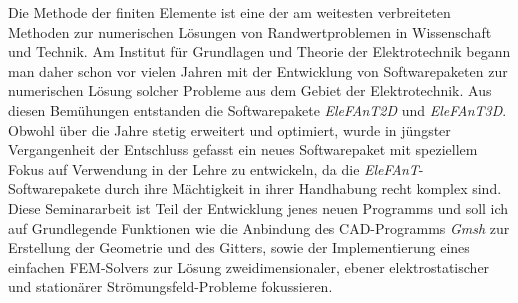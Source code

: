 Die Methode der finiten Elemente ist eine der am weitesten verbreiteten Methoden zur numerischen Lösungen von Randwertproblemen in Wissenschaft und Technik. Am Institut für Grundlagen und Theorie der Elektrotechnik begann man daher schon vor vielen Jahren mit der Entwicklung von Softwarepaketen zur numerischen Lösung solcher Probleme aus dem Gebiet der Elektrotechnik. Aus diesen Bemühungen entstanden die Softwarepakete \textit{EleFAnT2D} und \textit{EleFAnT3D}.\newline
Obwohl über die Jahre stetig erweitert und optimiert, wurde in jüngster Vergangenheit der Entschluss gefasst ein neues Softwarepaket mit speziellem Fokus auf Verwendung in der Lehre zu entwickeln, da die \textit{EleFAnT}-Softwarepakete durch ihre Mächtigkeit in ihrer Handhabung recht komplex sind.\newline
Diese Seminararbeit ist Teil der Entwicklung jenes neuen Programms und soll ich auf Grundlegende Funktionen wie die Anbindung des CAD-Programms \textit{Gmsh}\cite{gmsh_website} zur Erstellung der Geometrie und des Gitters, sowie der Implementierung eines einfachen FEM-Solvers zur Lösung zweidimensionaler, ebener elektrostatischer und stationärer Strömungsfeld-Probleme fokussieren.
\newpage
